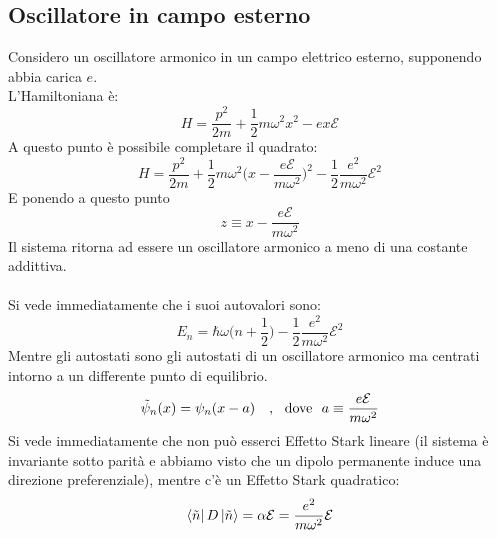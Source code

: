 \documentclass[twoside]{article}
\begin{document}
\subsection{Oscillatore in campo esterno}
Considero un oscillatore armonico in un campo elettrico esterno, supponendo abbia carica $e$.
\\
L'Hamiltoniana è:
\begin{equation}
    H=\frac{p^2}{2m}+\frac{1}{2}m\omega^2 x^2 -ex\mathcal{E}
\end{equation}
A questo punto è possibile completare il quadrato:
\begin{equation}
    H=\frac{p^2}{2m}+\frac{1}{2}m\omega^2\biggl( x-\frac{e\mathcal{E}}{m\omega^2} \biggr)^2 -\frac{1}{2}\frac{e^2}{m\omega^2}\mathcal{E}^2
\end{equation}
E ponendo a questo punto 
\begin{equation*}
    z\equiv x-\frac{e\mathcal{E}}{m\omega^2}
\end{equation*}
Il sistema ritorna ad essere un oscillatore armonico a meno di una costante addittiva.
\\ \\
Si vede immediatamente che i suoi autovalori sono:
\begin{equation}
    E_n=\hbar\omega \biggl( n+\frac{1}{2} \biggr) -\frac{1}{2}\frac{e^2}{m\omega^2}\mathcal{E}^2
\end{equation}
Mentre gli autostati sono gli autostati di un oscillatore armonico ma centrati intorno a un differente punto di equilibrio.
\begin{equation}
    \Tilde{\psi}_n(x)=\psi_n (x-a) \ \ \ , \ \ \text{dove} \ \ a\equiv\frac{e\mathcal{E}}{m\omega^2}
\end{equation}
Si vede immediatamente che non può esserci Effetto Stark lineare (il sistema è invariante sotto parità e abbiamo visto che un dipolo permanente induce una direzione preferenziale), mentre c'è un Effetto Stark quadratico:
\begin{equation}
    \bra{\Tilde{n}}D\ket{\Tilde{n}}=\alpha\mathcal{E}=\frac{e^2}{m\omega^2}\mathcal{E}
\end{equation}

\vspace{0.5cm}
\end{document}
